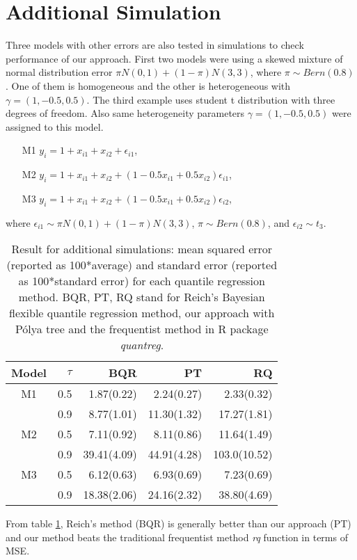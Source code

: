 \documentclass[12pt]{article}
\newcommand{\polya}{P\'{o}lya}
\begin{document}



\appendix
\section{Additional Simulation}

Three models with other errors are also tested in simulations to check
performance of our approach. First two models were using a skewed
mixture of normal distribution error \citep{reich2010} $\pi N(0,1) +
(1-\pi) N(3,3)$, where $\pi \sim Bern(0.8)$. One of them is
homogeneous and the other is heterogeneous with $\gamma=(1,
-0.5,0.5)$. The third example uses student t distribution with three degrees
of freedom. Also same heterogeneity parameters $\gamma=(1,
-0.5,0.5)$ were assigned to this model.

\begin{itemize}
\item [M1] $y_i = 1+x_{i1} + x_{i2} + \epsilon_{i1}$,
\item [M2] $y_i = 1+x_{i1} + x_{i2} + (1 -0.5x_{i1} +
  0.5x_{i2})\epsilon_{i1}$,
\item [M3] $y_i = 1+x_{i1} + x_{i2} + (1 -0.5x_{i1} +
  0.5x_{i2})\epsilon_{i2}$,
\end{itemize}
where $\epsilon_{i1} \sim \pi N(0,1) + (1-\pi) N(3,3)$, $\pi \sim
Bern(0.8)$, and $\epsilon_{i2} \sim t_3$.

\begin{table}[htbp]\label{tab:add}
  \caption[]{ Result for additional simulations: mean squared error
    (reported as 100*average) and standard error (reported as
    100*standard error) for each quantile regression method. BQR,
    PT, RQ stand for Reich's Bayesian flexible quantile regression
    method, our approach with \polya{} tree and the frequentist method
    in R package \textit{quantreg}. }
  \vspace{4mm}

  \centering
  \begin{tabular}[tb]{crrrr}
    \toprule
    Model & $\tau$ & BQR         & PT          & RQ           \\
    \hline
    M1    & 0.5    & 1.87(0.22)  & 2.24(0.27)  & 2.33(0.32)   \\
          & 0.9    & 8.77(1.01)  & 11.30(1.32) & 17.27(1.81)  \\
    M2    & 0.5    & 7.11(0.92)  & 8.11(0.86)  & 11.64(1.49)  \\
          & 0.9    & 39.41(4.09) & 44.91(4.28) & 103.0(10.52) \\
    M3    & 0.5    & 6.12(0.63)  & 6.93(0.69)  & 7.23(0.69)   \\
          & 0.9    & 18.38(2.06) & 24.16(2.32) & 38.80(4.69)  \\
    \bottomrule
  \end{tabular}
\end{table}

From table \ref{tab:add}, Reich's method (BQR) is generally better
than our approach (PT) and our method beats the traditional
frequentist method \textit{rq} function in terms of MSE.
\end{document}
